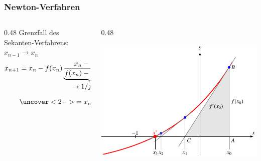 %
%
%
\begin{frame}
\frametitle{Newton-Verfahren}
\begin{columns}[t]
\begin{column}{0.48\hsize}
Grenzfall des Sekanten-Verfahrens: $x_{n-1}\to x_n$
\begin{align*}
x_{n+1}
&=
x_n - f(x_n)
\underbrace{
\frac{x_n-x_{n-1}}{f(x_n)-f(x_{n-1})}}_{\displaystyle\to 1/f'(x_n)}
\\
&\uncover<2->{=
x_{n+1} - \frac{f(x_n)}{f'(x_n)}}
\end{align*}
\end{column}
\begin{column}{0.48\hsize}
\begin{center}
\includegraphics[width=\hsize]{../../buch/chapters/20-gleichungen/figures/newton.pdf}
\end{center}
\end{column}
\end{columns}
\end{frame}
